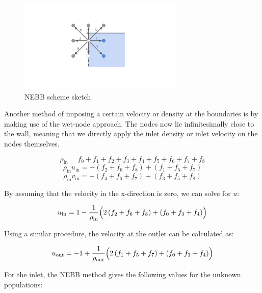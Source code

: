 \begin{figure}[htp]
    \centering
    \includegraphics[width=0.7\textwidth]{figures/NEBB.pdf}
    \caption{NEBB scheme sketch}\label{fig:NEBB}
\end{figure}


Another method of imposing a certain velocity or density at the boundaries is by making use of the wet-node approach. The nodes now lie infinitesimally close to the wall, meaning that we directly apply the inlet density or inlet velocity on the nodes themselves. 

\begin{equation}
    \rho_{\text{in}} = f_0 + f_1 + f_2 + f_3 + f_4 + f_5 + f_6 + f_7 + f_8
\end{equation}
\begin{equation}
    \rho_{\text{in}} u_{\text{in}} = -\left( f_2 + f_6 + f_8 \right) + \left(f_1 + f_5 + f_7\right)
\end{equation}
\begin{equation}
    \rho_{\text{in}} v_{\text{in}} = -\left( f_4 + f_6 + f_7 \right) + \left(f_3 + f_5 + f_8\right)
\end{equation}

By assuming that the velocity in the x-direction is zero, we can solve for $u$:

\begin{equation}
    u_{\text{in}} = 1 - \frac{1}{\rho_{\text{in}}}\Bigl( 2\left( f_2 + f_6 + f_8 \right) + \left( f_0 + f_3 + f_4 \right) \Bigr)
\end{equation}

Using a similar procedure, the velocity at the outlet can be calculated as:

\begin{equation}
    u_{\text{out}} = -1 + \frac{1}{\rho_{\text{out}}}\Bigl( 2\left( f_1 + f_5 + f_7 \right) + \left( f_0 + f_3 + f_4 \right) \Bigr)
\end{equation}

For the inlet, the NEBB method gives the following values for the unknown populations:

